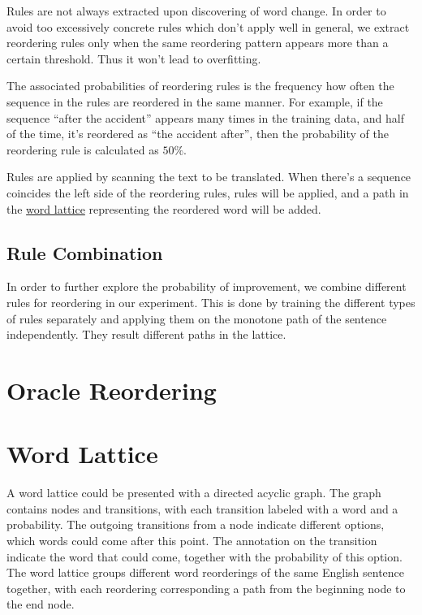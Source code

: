 Rules are not always extracted upon discovering of word change. In order to avoid too excessively concrete rules which don't apply well in general, we extract reordering rules only when the same reordering pattern appears more than a certain threshold. Thus it won't lead to overfitting.

The associated probabilities of reordering rules is the frequency how often the sequence in the rules are reordered in the same manner. For example, if the sequence ``after the accident'' appears many times in the training data, and half of the time, it's reordered as ``the accident after'', then the probability of the reordering rule is calculated as $50\%$.

Rules are applied by scanning the text to be translated. When there's a sequence coincides the left side of the reordering rules, rules will be applied, and a path in the \hyperref[ch:Foundations:sec:Lattices]{word lattice} representing the reordered word will be added.

\subsection{Rule Combination}

In order to further explore the probability of improvement, we combine different rules for reordering in our experiment. This is done by training the different types of rules separately and applying them on the monotone path of the sentence independently. They result different paths in the lattice.



\section{Oracle Reordering}
\label{ch:Foundations:sec:oracle}



\section{Word Lattice}
\label{ch:Foundations:sec:Lattices}
\label{latticecreation}
A word lattice could be presented with a directed acyclic graph. The graph contains nodes and transitions, with each transition labeled with a word and a probability. The outgoing transitions from a node indicate different options, which words could come after this point. The annotation on the transition indicate the word that could come, together with the probability of this option. The word lattice groups different word reorderings of the same English sentence together, with each reordering corresponding a path from the beginning node to the end node. 

